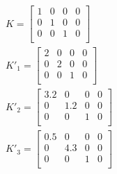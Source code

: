 \begin{gather}
K = \begin{bmatrix}
1&0&0&0\\
0&1&0&0\\
0&0&1&0\\
\end{bmatrix}\\
K'_1 = \begin{bmatrix}
2&0&0&0\\
0&2&0&0\\
0&0&1&0\\
\end{bmatrix}\\
K'_2 = \begin{bmatrix}
3.2&0&0&0\\
0&1.2&0&0\\
0&0&1&0\\
\end{bmatrix}\\
K'_3 = \begin{bmatrix}
0.5&0&0&0\\
0&4.3&0&0\\
0&0&1&0\\
\end{bmatrix}
\end{gather}\\


